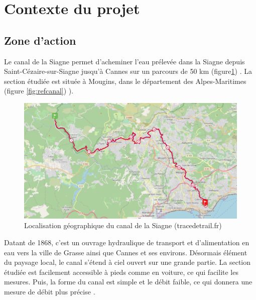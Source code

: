 \documentclass[
]{article}
\begin{document}
\newpage

\hypertarget{contexte-du-projet}{%
\section{Contexte du projet}\label{contexte-du-projet}}

\hypertarget{zone-daction}{%
\subsection{Zone d'action}\label{zone-daction}}

Le canal de la Siagne permet d'acheminer l'eau prélevée dans la Siagne depuis Saint-Cézaire-sur-Siagne jusqu'à Cannes sur un parcours de 50 km (figure\ref{fig:refsiagne}) . La section étudiée est située à Mougins, dans le département des Alpes-Maritimes (figure \ref{fig:refcanal}) ).



\begin{figure}[H]
\includegraphics[width=1\linewidth,]{images/siagne} \caption{Localisation géographique du canal de la Siagne (tracedetrail.fr)}\label{fig:refsiagne}
\end{figure}

Datant de 1868, c'est un ouvrage hydraulique de transport et d'alimentation en eau vers la ville de Grasse ainsi que Cannes et ses environs.
Désormais élément du paysage local, le canal s'étend à ciel ouvert sur une grande partie.
La section étudiée est facilement accessible à pieds comme en voiture, ce qui facilite les mesures. Puis, la forme du canal est simple et le débit faible, ce qui donnera une mesure de débit plus précise \citep{noauthor_canaldelasiagnefr_2019}.
\end{document}
